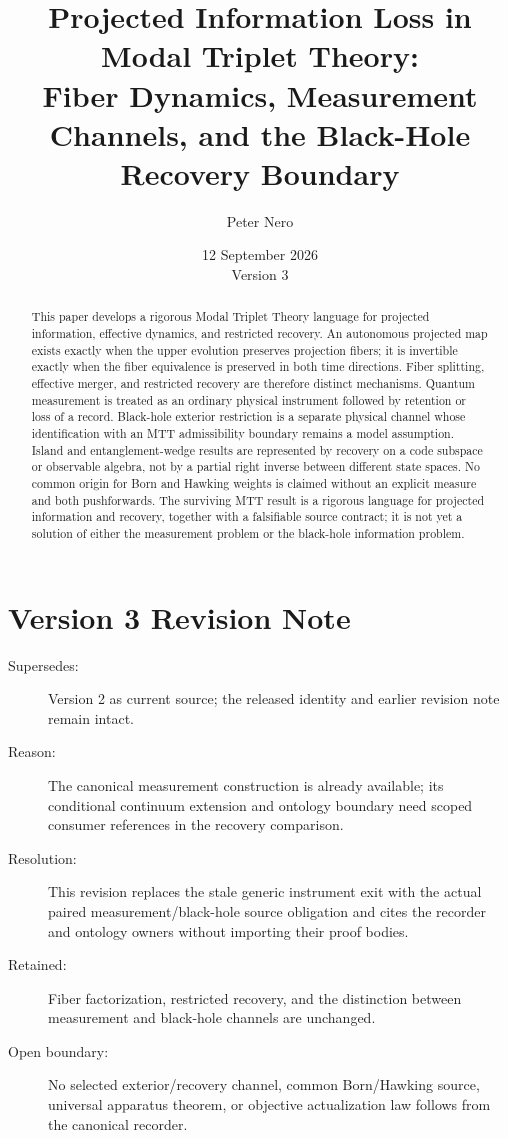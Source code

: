 \documentclass[11pt]{article}
\title{Projected Information Loss in Modal Triplet Theory:\\
\large Fiber Dynamics, Measurement Channels, and the Black-Hole Recovery Boundary}
\author{Peter Nero}
\date{12 September 2026\\Version 3}
\begin{document}
\maketitle

\begin{abstract}
This paper develops a rigorous Modal Triplet Theory language for projected
information, effective dynamics, and restricted recovery. An autonomous
projected map
exists exactly when the upper evolution preserves projection fibers; it is
invertible exactly when the fiber equivalence is preserved in both time
directions. Fiber splitting, effective merger, and restricted recovery are
therefore distinct mechanisms. Quantum measurement is treated as an ordinary
physical instrument followed by retention or loss of a record. Black-hole
exterior restriction is a separate physical channel whose identification with
an MTT admissibility boundary remains a model assumption. Island and
entanglement-wedge results are represented by recovery on a code subspace or
observable algebra, not by a partial right inverse between different state
spaces. No common origin for Born and Hawking weights is claimed without an
explicit measure and both pushforwards. The surviving MTT result is a rigorous
language for projected information and recovery, together with a falsifiable
source contract; it is not yet a solution of either the measurement problem or
the black-hole information problem.
\end{abstract}

\section*{Version 3 Revision Note}
\begin{description}
\item[Supersedes:] Version 2 as current source; the released identity and
earlier revision note remain intact.
\item[Reason:] The canonical measurement construction is already available;
its conditional continuum extension and ontology boundary need scoped
consumer references in the recovery comparison.
\item[Resolution:] This revision replaces the stale generic instrument exit
with the actual paired measurement/black-hole source obligation and cites
the recorder and ontology owners without importing their proof bodies.
\item[Retained:] Fiber factorization, restricted recovery, and the distinction
between measurement and black-hole channels are unchanged.
\item[Open boundary:] No selected exterior/recovery channel, common
Born/Hawking source, universal apparatus theorem, or objective actualization
law follows from the canonical recorder.
\end{description}
\end{document}
